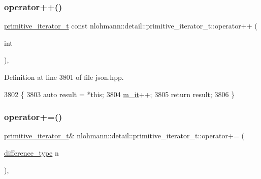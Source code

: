 \subsubsection{\texorpdfstring{operator++()}{operator++()}\hspace{0.1cm}{\footnotesize\ttfamily [2/2]}}
{\footnotesize\ttfamily \hyperlink{classnlohmann_1_1detail_1_1primitive__iterator__t}{primitive\+\_\+iterator\+\_\+t} const nlohmann\+::detail\+::primitive\+\_\+iterator\+\_\+t\+::operator++ (\begin{DoxyParamCaption}\item[{int}]{ }\end{DoxyParamCaption})\hspace{0.3cm}{\ttfamily [inline]}, {\ttfamily [noexcept]}}



Definition at line 3801 of file json.\+hpp.


\begin{DoxyCode}
3802     \{
3803         \textcolor{keyword}{auto} result = *\textcolor{keyword}{this};
3804         \hyperlink{classnlohmann_1_1detail_1_1primitive__iterator__t_a4357355113b0cd7e12b15c2e93703510}{m\_it}++;
3805         \textcolor{keywordflow}{return} result;
3806     \}
\end{DoxyCode}
\mbox{\label{classnlohmann_1_1detail_1_1primitive__iterator__t_aee01535df0b3b40137d9241029a9a203}} 
\subsubsection{\texorpdfstring{operator+=()}{operator+=()}}
{\footnotesize\ttfamily \hyperlink{classnlohmann_1_1detail_1_1primitive__iterator__t}{primitive\+\_\+iterator\+\_\+t}\& nlohmann\+::detail\+::primitive\+\_\+iterator\+\_\+t\+::operator+= (\begin{DoxyParamCaption}\item[{\hyperlink{classnlohmann_1_1detail_1_1primitive__iterator__t_af3db0d5c90de427d51645fe73a015553}{difference\+\_\+type}}]{n }\end{DoxyParamCaption})\hspace{0.3cm}{\ttfamily [inline]}, {\ttfamily [noexcept]}}



